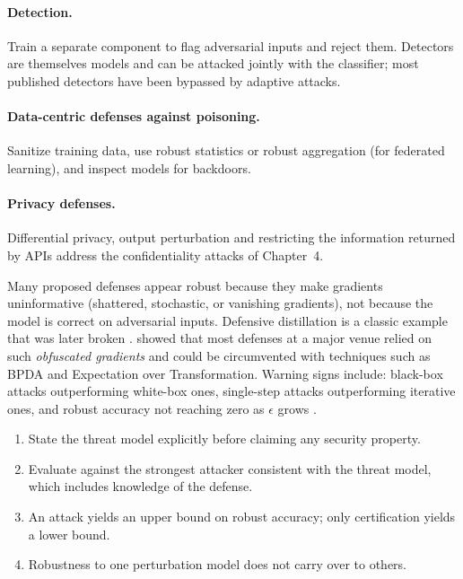 \documentclass[10pt,a4paper]{extarticle}
\theoremstyle{definition}
\begin{document}
\paragraph{Detection.} Train a separate component to flag adversarial inputs and reject them. Detectors are themselves models and can be attacked jointly with the classifier; most published detectors have been bypassed by adaptive attacks.

\paragraph{Data-centric defenses against poisoning.} Sanitize training data, use robust statistics or robust aggregation (for federated learning), and inspect models for backdoors.

\paragraph{Privacy defenses.} Differential privacy, output perturbation and restricting the information returned by APIs address the confidentiality attacks of Chapter~4.

\begin{warnbox}
Many proposed defenses appear robust because they make gradients uninformative (shattered, stochastic, or vanishing gradients), not because the model is correct on adversarial inputs. Defensive distillation \citep{papernot2016distillation} is a classic example that was later broken \citep{carlini2017towards}. \citet{athalye2018obfuscated} showed that most defenses at a major venue relied on such \emph{obfuscated gradients} and could be circumvented with techniques such as BPDA and Expectation over Transformation. Warning signs include: black-box attacks outperforming white-box ones, single-step attacks outperforming iterative ones, and robust accuracy not reaching zero as \(\epsilon\) grows \citep{carlini2019evaluating}.
\end{warnbox}

\begin{keybox}
\begin{enumerate}
  \item State the threat model explicitly before claiming any security property.
  \item Evaluate against the strongest attacker consistent with the threat model, which includes knowledge of the defense.
  \item An attack yields an upper bound on robust accuracy; only certification yields a lower bound.
  \item Robustness to one perturbation model does not carry over to others.
\end{enumerate}
\end{keybox}
\end{document}
